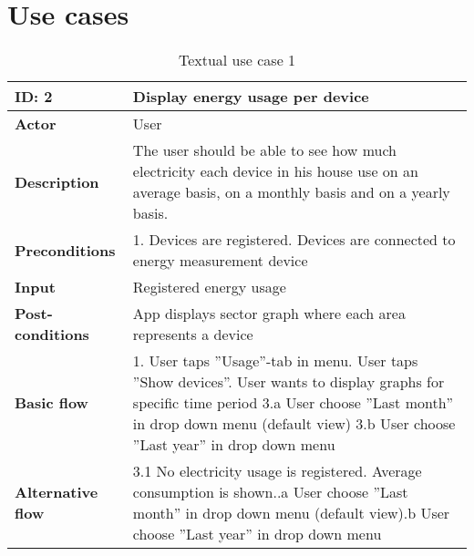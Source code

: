 \chapter{Use cases}

\begin{table}[H]
\begin{tabular}{|l|p{11.7cm}|}
\hline
\textbf{ID: }2&\textbf{Display energy usage per device}\\\hline
\textbf{Actor} &User\\\hline
\textbf{Description}&
The user should be able to see how much electricity each device in his house use on an average basis, on a monthly basis and on a yearly basis.\\\hline
\textbf{Preconditions}&
1. Devices are registered\newline
2. Devices are connected to energy measurement device\\\hline
\textbf{Input}&
Registered energy usage\\\hline
\textbf{Post-conditions}& App displays sector graph where each area represents a device\\\hline
\textbf{Basic flow}&
1. User taps ''Usage''-tab in menu\newline
2. User taps ''Show devices''\newline
3. User wants to display graphs for specific time period\newline
3.a User choose ''Last month'' in drop down menu (default view)\newline
3.b User choose ''Last year'' in drop down menu\\\hline
\textbf{Alternative flow}&
3.1 No electricity usage is registered. Average consumption is shown.\newline
3.1.a User choose ''Last month'' in drop down menu (default view)\newline
3.1.b User choose ''Last year'' in drop down menu\\\hline
\end{tabular}
\caption{Textual use case 1}
\end{table}


